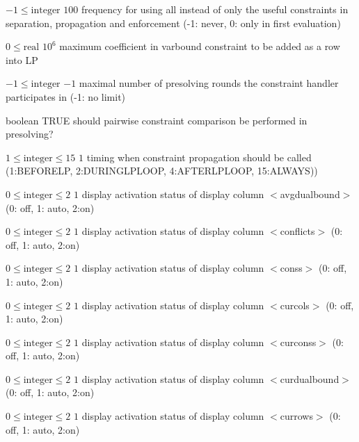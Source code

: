 %
{$-1\leq\textrm{integer}$}%
{$100$}%
{frequency for using all instead of only the useful constraints in separation, propagation and enforcement (-1: never, 0: only in first evaluation)}%
{}

%
{$0\leq\textrm{real}$}%
{$10^{  6}$}%
{maximum coefficient in varbound constraint to be added as a row into LP}%
{}

%
{$-1\leq\textrm{integer}$}%
{$-1$}%
{maximal number of presolving rounds the constraint handler participates in (-1: no limit)}%
{}

%
{boolean}%
{TRUE}%
{should pairwise constraint comparison be performed in presolving?}%
{}

%
{$1\leq\textrm{integer}\leq15$}%
{$1$}%
{timing when constraint propagation should be called (1:BEFORELP, 2:DURINGLPLOOP, 4:AFTERLPLOOP, 15:ALWAYS))}%
{}

%
{$0\leq\textrm{integer}\leq2$}%
{$1$}%
{display activation status of display column $<$avgdualbound$>$ (0: off, 1: auto, 2:on)}%
{}

%
{$0\leq\textrm{integer}\leq2$}%
{$1$}%
{display activation status of display column $<$conflicts$>$ (0: off, 1: auto, 2:on)}%
{}

%
{$0\leq\textrm{integer}\leq2$}%
{$1$}%
{display activation status of display column $<$conss$>$ (0: off, 1: auto, 2:on)}%
{}

%
{$0\leq\textrm{integer}\leq2$}%
{$1$}%
{display activation status of display column $<$curcols$>$ (0: off, 1: auto, 2:on)}%
{}

%
{$0\leq\textrm{integer}\leq2$}%
{$1$}%
{display activation status of display column $<$curconss$>$ (0: off, 1: auto, 2:on)}%
{}

%
{$0\leq\textrm{integer}\leq2$}%
{$1$}%
{display activation status of display column $<$curdualbound$>$ (0: off, 1: auto, 2:on)}%
{}

%
{$0\leq\textrm{integer}\leq2$}%
{$1$}%
{display activation status of display column $<$currows$>$ (0: off, 1: auto, 2:on)}%
{}

